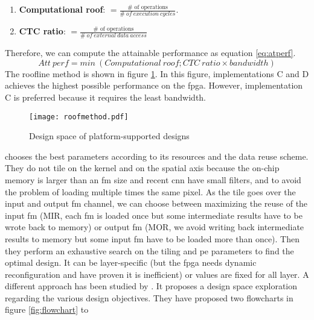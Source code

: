 \begin{enumerate}
    \item \textbf{Computational roof}: $= \frac{\text{\# \ of \ operations}}{\# \ of \ execution \ cycles}$.
    \item \textbf{CTC ratio}: $= \frac{\text{\# \ of \ operations}}{\# \ of \ external \ data \ access}$
\end{enumerate}
Therefore, we can compute the attainable performance as equation \ref{eq:atperf}.
\begin{equation}
Att \ perf = min \ (Computational \ roof; CTC \ ratio \times bandwidth)
\label{eq:atperf}
\end{equation}
The roofline method is shown in figure \ref{fig:roofmeth}. In this figure, implementations C and D achieves the highest possible performance on the \acrshort{fpga}. However, implementation C is preferred because it requires the least bandwidth.
%
\begin{figure}
    \centering
    \texttt{[image: roofmethod.pdf]}
    \caption{Design space of platform-supported designs  \cite{zhang_optimizing_2015}}
    \label{fig:roofmeth}
\end{figure} \newline \newline
%
\cite{motamedi_placid_2017} chooses the best parameters according to its resources and the data reuse scheme. They do not tile on the kernel and on the spatial axis because the on-chip memory is larger than an \acrshort{fm} size and recent \acrshort{cnn} have small filters, and to avoid the problem of loading multiple times the same pixel. As the tile goes over the input and output \acrshort{fm} channel, we can choose between maximizing the reuse of the input \acrshort{fm} (MIR, each \acrshort{fm} is loaded once but some intermediate results have to be wrote back to memory) or output \acrshort{fm} (MOR, we avoid writing back intermediate results to memory but some input \acrshort{fm} have to be loaded more than once). Then they perform an exhaustive search on the tiling and \acrshort{pe} parameters to find the optimal design. It can be layer-specific (but the \acrshort{fpga} needs dynamic reconfiguration and \textcite{zhang_optimizing_2015} have proven it is inefficient) or values are fixed for all layer.
%
A different approach has been studied by \cite{ma_optimizing_2018}. It proposes a design space exploration regarding the various design objectives. They have proposed two flowcharts in figure \ref{fig:flowchart} to
